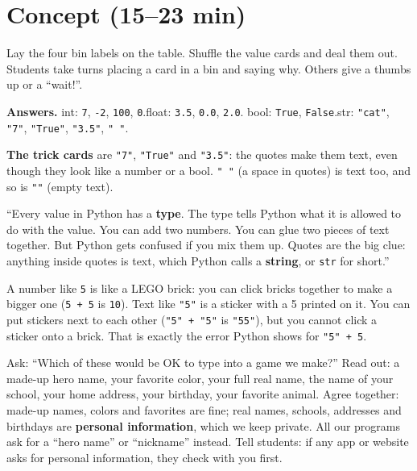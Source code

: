 \section{Concept (15--23 min)}
\begin{unplugged}
Lay the four bin labels on the table. Shuffle the value cards and deal them out. Students take turns placing a
card in a bin and saying why. Others give a thumbs up or a \enquote{wait!}.
\par\textbf{Answers.} int: \texttt{7}, \texttt{-2}, \texttt{100}, \texttt{0}.\quad float: \texttt{3.5}, \texttt{0.0}, \texttt{2.0}.\quad
bool: \texttt{True}, \texttt{False}.\quad str: \texttt{"cat"}, \texttt{"7"}, \texttt{"True"}, \texttt{"3.5"}, \texttt{" "}.
\par\textbf{The trick cards} are \texttt{"7"}, \texttt{"True"} and \texttt{"3.5"}: the quotes make them text, even though they look like a number or a bool.
\texttt{" "} (a space in quotes) is text too, and so is \texttt{""} (empty text).
\end{unplugged}

\begin{teacherscript}[Say]
\enquote{Every value in Python has a \textbf{type}. The type tells Python what it is allowed to do with the value.
You can add two numbers. You can glue two pieces of text together. But Python gets confused if you mix them up.
Quotes are the big clue: anything inside quotes is text, which Python calls a \textbf{string}, or \texttt{str} for short.}
\end{teacherscript}

\begin{analogy}
A number like \texttt{5} is like a LEGO brick: you can click bricks together to make a bigger one (\texttt{5 + 5} is \texttt{10}).
Text like \texttt{"5"} is a sticker with a 5 printed on it. You can put stickers next to each other
(\texttt{"5" + "5"} is \texttt{"55"}), but you cannot click a sticker onto a brick. That is exactly the error Python shows for \texttt{"5" + 5}.
\end{analogy}

\begin{safety}
Ask: \enquote{Which of these would be OK to type into a game we make?} Read out: a made-up hero name, your favorite color,
your full real name, the name of your school, your home address, your birthday, your favorite animal.
Agree together: made-up names, colors and favorites are fine; real names, schools, addresses and birthdays are
\textbf{personal information}, which we keep private. All our programs ask for a \enquote{hero name} or \enquote{nickname} instead.
Tell students: if any app or website asks for personal information, they check with you first.
\end{safety}

